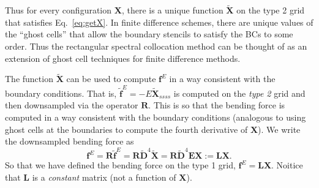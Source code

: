 Thus for every configuration $\bm{X}$, there is a unique function $\tilde{\bm{X}}$ on the type 2 grid that satisfies Eq.\ \eqref{eq:getX}.  In finite difference schemes, there are unique values of the ``ghost cells'' that allow the boundary stencils to satisfy the BCs to some order. Thus the rectangular spectral collocation method can be thought of as an extension of ghost cell techniques for finite difference methods.  

The function $\tilde{\bm{X}}$ can be used to compute $\bm{f}^E$ in a way consistent with the boundary conditions. That is, $\tilde{\bm{f}}^E=-E\tilde{\bm{X}}_{ssss}$ is computed on the \textit{type 2} grid and then downsampled via the operator $\bm{R}$. This is so that the bending force is computed in a way consistent with the boundary conditions (analogous to using ghost cells at the boundaries to compute the fourth derivative of $\bm{X}$). We write the downsampled bending force as
\begin{equation}
\label{eq:fE}
\bm{f}^E=\bm{R}\tilde{\bm{f}}^E=\bm{R}\tilde{\bm{D}}^4 \tilde{\bm{X}} = \bm{R}\tilde{\bm{D}}^4 \bm{E}\bm{X}:=\bm{L}\bm{X}.
\end{equation}
So that we have defined the bending force on the type 1 grid, $\bm{f}^E=\bm{L}\bm{X}$. Noitice that $\bm{L}$ is a \textit{constant} matrix (not a function of $\bm{X}$). 

